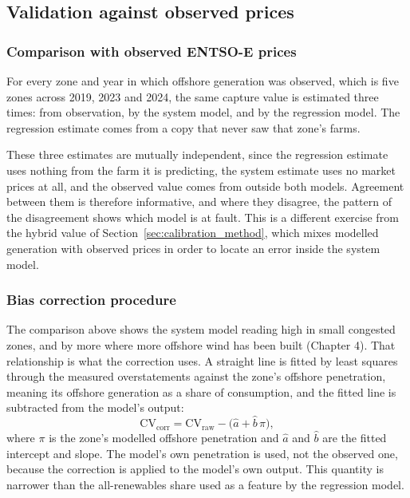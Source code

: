 \subsection{Validation against observed prices}\label{sec:confrontation}

\subsubsection{Comparison with observed ENTSO-E prices}\label{sec:triangle}

For every zone and year in which offshore generation was observed,
which is five zones across 2019, 2023 and 2024, the same capture value is
estimated three times: from observation, by the system model, and by the
regression model. The regression estimate comes from a copy that never saw that
zone's farms.

These three estimates are mutually independent, since the regression estimate
uses nothing from the farm it is predicting, the system estimate uses no
market prices at all, and the observed value comes from outside both models.
Agreement between them is therefore informative, and where they disagree, the pattern of the
disagreement shows which model is at fault. This is a different exercise from
the hybrid value of Section~\ref{sec:calibration_method}, which
mixes modelled generation with observed prices in order to locate an error
inside the system model.

\subsubsection{Bias correction procedure}\label{sec:bias_method}

The comparison above shows the system model reading high in small congested
zones, and by more where more offshore wind has been built (Chapter 4). That
relationship is what the correction uses. A straight line is fitted by least
squares through the measured overstatements against the zone's offshore
penetration, meaning its offshore generation as a share of consumption, and the
fitted line is subtracted from the model's output:
%
\begin{equation}
    \mathrm{CV}_{\mathrm{corr}} = \mathrm{CV}_{\mathrm{raw}}
    - \bigl(\hat{a} + \hat{b}\,\pi\bigr),
    \label{eq:bias}
\end{equation}
%
where $\pi$ is the zone's modelled offshore penetration and $\hat{a}$ and
$\hat{b}$ are the fitted intercept and slope. The model's own penetration is
used, not the observed one, because the correction is applied to the model's
own output. This quantity is narrower than the all-renewables share used as a
feature by the regression model.


